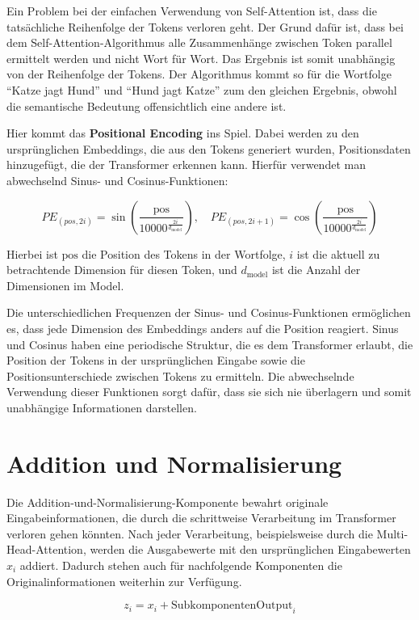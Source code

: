Ein Problem bei der einfachen Verwendung von Self-Attention ist, dass die tatsächliche Reihenfolge der Tokens verloren geht.  
Der Grund dafür ist, dass bei dem Self-Attention-Algorithmus alle Zusammenhänge zwischen Token parallel ermittelt werden und nicht Wort für Wort.   
Das Ergebnis ist somit unabhängig von der Reihenfolge der Tokens.
Der Algorithmus kommt so für die Wortfolge \enquote{Katze jagt Hund} und \enquote{Hund jagt Katze} zum den gleichen Ergebnis, obwohl die semantische Bedeutung offensichtlich eine andere ist. 

Hier kommt das \textbf{Positional Encoding} ins Spiel.  
Dabei werden zu den ursprünglichen Embeddings, die aus den Tokens generiert wurden, Positionsdaten hinzugefügt, die der Transformer erkennen kann.  
Hierfür verwendet man abwechselnd Sinus- und Cosinus-Funktionen:

\[
PE_{(pos, 2i)} = \sin\left(\frac{\text{pos}}{10000^{\frac{2i}{d_{\text{model}}}}}\right), \quad
PE_{(pos, 2i+1)} = \cos\left(\frac{\text{pos}}{10000^{\frac{2i}{d_{\text{model}}}}}\right)
\]

Hierbei ist \( \text{pos} \) die Position des Tokens in der Wortfolge, \( i \) ist die aktuell zu betrachtende Dimension für diesen Token, und \( d_{\text{model}} \) ist die Anzahl der Dimensionen im Model.

Die unterschiedlichen Frequenzen der Sinus- und Cosinus-Funktionen ermöglichen es, dass jede Dimension des Embeddings anders auf die Position reagiert.  
Sinus und Cosinus haben eine periodische Struktur, die es dem Transformer erlaubt, die Position der Tokens in der ursprünglichen Eingabe sowie die Positionsunterschiede zwischen Tokens zu ermitteln.  
Die abwechselnde Verwendung dieser Funktionen sorgt dafür, dass sie sich nie überlagern und somit unabhängige Informationen darstellen.

\section{Addition und Normalisierung}

Die Addition-und-Normalisierung-Komponente bewahrt originale Eingabeinformationen, die durch die schrittweise Verarbeitung im Transformer verloren gehen könnten. 
Nach jeder Verarbeitung, beispielsweise durch die Multi-Head-Attention, werden die Ausgabewerte mit den ursprünglichen Eingabewerten \( x_i \) addiert. 
Dadurch stehen auch für nachfolgende Komponenten die Originalinformationen weiterhin zur Verfügung.

\[
z_i = x_i + \text{SubkomponentenOutput}_i
\]

